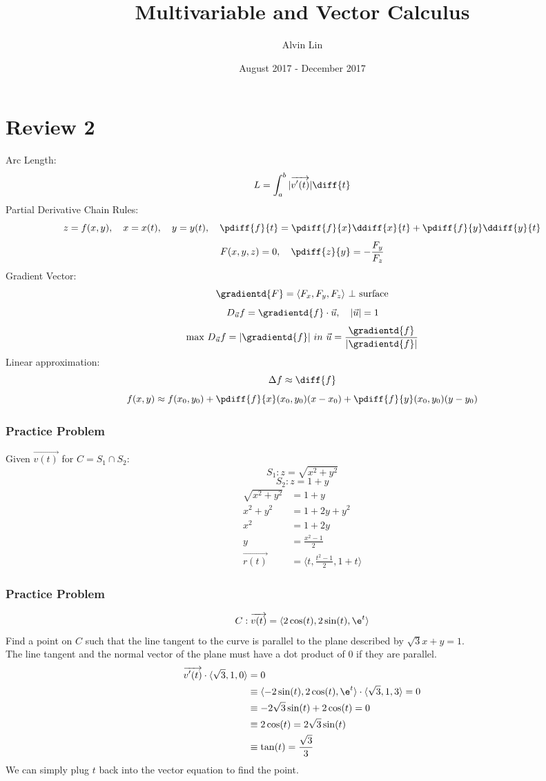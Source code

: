 \documentclass[letterpaper, 12pt]{math}
\title{Multivariable and Vector Calculus}
\author{Alvin Lin}
\date{August 2017 - December 2017}
\begin{document}
\maketitle

\section*{Review 2}
Arc Length:
\[ L = \int_{a}^{b}|\overrightarrow{v'(t)}|\diff{t} \]
Partial Derivative Chain Rules:
\[ z = f(x,y), \quad x = x(t), \quad y = y(t), \quad \pdiff{f}{t} =
  \pdiff{f}{x}\ddiff{x}{t}+ \pdiff{f}{y}\ddiff{y}{t} \]
\[ F(x,y,z) = 0, \quad \pdiff{z}{y} = -\frac{F_y}{F_z} \]
Gradient Vector:
\[ \gradientd{F} = \langle F_x,F_y,F_z\rangle~\bot~\text{surface} \]
\[ D_{\vec{u}}f = \gradientd{f}\cdot\vec{u},\quad |\vec{u}| = 1 \]
\[ \text{max }D_{\vec{u}}f = |\gradientd{f}|~in~\vec{u} =
  \frac{\gradientd{f}}{|\gradientd{f}|} \]
Linear approximation:
\[ \Delta{f} \approx \diff{f} \]
\[ f(x,y) \approx f(x_0,y_0)+\pdiff{f}{x}(x_0,y_0)(x-x_0)+
  \pdiff{f}{y}(x_0,y_0)(y-y_0) \]

\subsubsection*{Practice Problem}
Given \( \overrightarrow{v(t)} \) for \( C = S_1\cap S_2 \):
\[ S_1: z = \sqrt{x^2+y^2} \]
\[ S_2: z = 1+y \]
\begin{align*}
  \sqrt{x^2+y^2} &= 1+y \\
  x^2+y^2 &= 1+2y+y^2 \\
  x^2 &= 1+2y \\
  y &= \frac{x^2-1}{2} \\
  \overrightarrow{r(t)} &= \langle t,\frac{t^2-1}{2},1+t\rangle
\end{align*}

\subsubsection*{Practice Problem}
\[ C: \overrightarrow{v(t)} = \langle2\cos(t),2\sin(t),\e^t\rangle \]
Find a point on \( C \) such that the line tangent to the curve is parallel
to the plane described by \( \sqrt{3}x+y = 1 \). \\
The line tangent and the normal vector of the plane must have a dot product of
0 if they are parallel.
\begin{align*}
  \overrightarrow{v'(t)}\cdot\langle\sqrt{3},1,0\rangle &= 0 \\
  &\equiv \langle-2\sin(t),2\cos(t),\e^t\rangle\cdot
    \langle\sqrt{3},1,3\rangle = 0 \\
  &\equiv -2\sqrt{3}\sin(t)+2\cos(t) = 0 \\
  &\equiv 2\cos(t) = 2\sqrt{3}\sin(t) \\
  &\equiv \tan(t) = \frac{\sqrt{3}}{3}
\end{align*}
We can simply plug \( t \) back into the vector equation to find the point.
\end{document}
